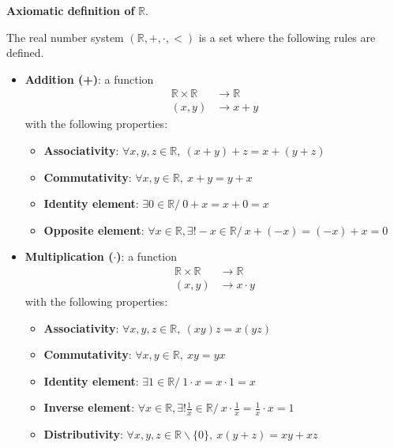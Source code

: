 \documentclass[12pt, a4paper]{book}
\begin{document}
\begin{defn}
  \textbf{Axiomatic definition of }$\mathbb{R}$.

  The real number system $(\mathbb{R}, +, \cdot, <)$ is a set where the following rules are defined.

  \begin{itemize}
    \item \textbf{Addition (+)}: a function
    \begin{align*}
      \mathbb{R}\times \mathbb{R} &\longrightarrow \mathbb{R} \\
      (x,y) &\longrightarrow x+y
    \end{align*}
    with the following properties:
    \begin{itemize}
      \item \textbf{Associativity}: $\forall x,y,z \in \mathbb{R}, \ (x+y)+z=x+(y+z)$
      \item \textbf{Commutativity}: $\forall x,y \in \mathbb{R}, \ x+y=y+x$
      \item \textbf{Identity element}: $\exists 0 \in \mathbb{R}/ \ 0+x=x+0=x$
      \item \textbf{Opposite element}: $\forall x \in \mathbb{R}, \exists! -x\in\mathbb{R}/ \ x+(-x)=(-x)+x=0$
    \end{itemize}

    \item \textbf{Multiplication ($\cdot$)}: a function 
    \begin{align*}
      \mathbb{R}\times \mathbb{R} &\longrightarrow \mathbb{R} \\
      (x,y) &\longrightarrow x \cdot y
    \end{align*}
    with the following properties:
    \begin{itemize}
      \item \textbf{Associativity}: $\forall x,y,z \in \mathbb{R}, \ (xy)z=x(yz)$
      \item \textbf{Commutativity}: $\forall x,y \in \mathbb{R}, \ xy=yx$
      \item \textbf{Identity element}: $\exists 1 \in \mathbb{R}/ \ 1\cdot x=x\cdot 1=x$
      \item \textbf{Inverse element}: $\forall x \in \mathbb{R}, \exists! \frac{1}{x}\in\mathbb{R}/ \ x\cdot \frac{1}{x} = \frac{1}{x} \cdot x = 1$
      \item \textbf{Distributivity}: $\forall x,y,z \in \mathbb{R}\backslash \{0\}, \ x(y+z)=xy + xz$
    \end{itemize}


\end{itemize}
\end{defn}
\end{document}

